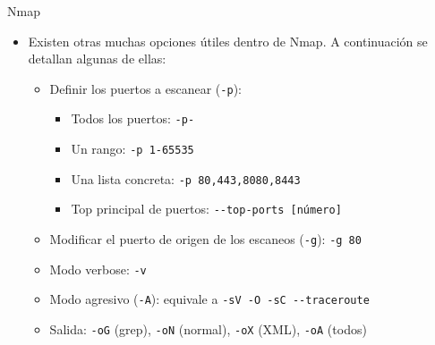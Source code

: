 \documentclass[aspectratio=169,11pt]{beamer}
\begin{document}
\begin{frame}{Nmap}
\small
  \begin{itemize}
  \item Existen otras muchas opciones útiles dentro de Nmap. A continuación se detallan algunas de ellas:
    \begin{itemize}
    \item Definir los puertos a escanear (\verb|-p|):
      \begin{itemize}
      \item Todos los puertos: \verb|-p-|
      \item Un rango: \verb|-p 1-65535|
      \item Una lista concreta: \verb|-p 80,443,8080,8443|
      \item Top principal de puertos: \verb|--top-ports [número]|
      \end{itemize}
    \item Modificar el puerto de origen de los escaneos (\verb|-g|): \verb|-g 80|
    \item Modo verbose: \verb|-v|
    \item Modo agresivo (\verb|-A|): equivale a \verb|-sV -O -sC --traceroute|
    \item Salida: \verb|-oG| (grep), \verb|-oN| (normal), \verb|-oX| (XML), \verb|-oA| (todos)
    \end{itemize}
  \end{itemize}
\end{frame}
\end{document}
